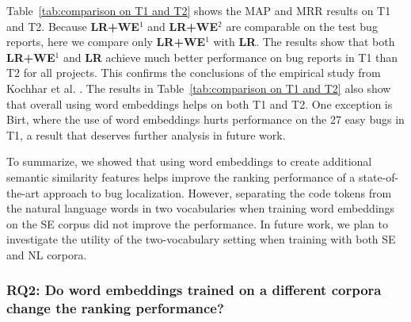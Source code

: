 Table~\ref{tab:comparison on T1 and T2} shows the MAP and MRR results on T1 and T2. Because \textbf{LR+WE$^1$} and \textbf{LR+WE$^2$} are comparable on the test bug reports, here we compare only \textbf{LR+WE$^1$} with \textbf{LR}. The results show that both \textbf{LR+WE$^1$} and \textbf{LR} achieve much better performance on bug reports in T1 than T2 for all projects. This confirms the conclusions of the empirical study from Kochhar et al. \cite{Kochhar:2014:PBB:2642937.2642997}. 
The results in Table~\ref{tab:comparison on T1 and T2} also show that overall using word embeddings helps on both T1 and T2. One exception is Birt, where the use of word embeddings hurts performance on the 27 easy bugs in T1, a result that deserves further analysis in future work.

To summarize, we showed that using word embeddings to create additional semantic similarity features helps improve the ranking performance of a state-of-the-art approach to bug localization. However, separating the code tokens from the natural language words in two vocabularies when training word embeddings on the SE corpus did not improve the performance. In future work, we plan to investigate the utility of the two-vocabulary setting when training with both SE and NL corpora.


\subsubsection{\textbf{RQ2:} Do word embeddings trained on a different corpora change the ranking performance?}
\label{sec:evaluation:rq3}

